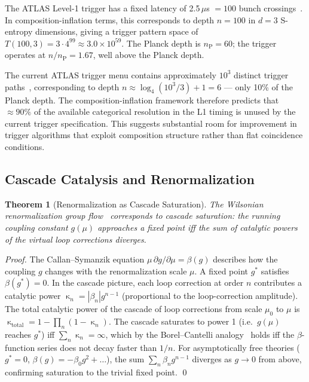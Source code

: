 \documentclass[twocolumn,10pt,a4paper]{article}
\theoremstyle{thmstyle}
\newtheorem{theorem}{Theorem}[section]
\theoremstyle{definition}
\theoremstyle{remark}
\newcommand{\nP}{n_{\mathrm{P}}}
\DeclareMathOperator{\catpow}{\kappa}
\begin{document}
The ATLAS Level-1 trigger has a fixed latency of 2.5\,$\mu$s $= 100$
bunch crossings~\citep{atlas_trigger_run2}. In composition-inflation
terms, this corresponds to depth $n = 100$ in $d = 3$ S-entropy
dimensions, giving a trigger pattern space of $T(100,3) = 3 \cdot
4^{99} \approx 3.0 \times 10^{59}$. The Planck depth is $\nP = 60$;
the trigger operates at $n/\nP = 1.67$, well above the Planck depth.

The current ATLAS trigger menu contains approximately $10^3$ distinct
trigger paths~\citep{atlas_trigger_run2}, corresponding to depth
$n \approx \log_4(10^3/3) + 1 = 6$ --- only 10\% of the Planck
depth. The composition-inflation framework therefore predicts that
$\approx 90\%$ of the available categorical resolution in the L1
timing is unused by the current trigger specification. This suggests
substantial room for improvement in trigger algorithms that exploit
composition structure rather than flat coincidence conditions.

\subsection{Cascade Catalysis and Renormalization}

\begin{theorem}[Renormalization as Cascade Saturation]
\label{thm:rg-saturation}
The Wilsonian renormalization group
flow~\citep{wilson1971renormalization,callan1970broken,symanzik1970small}
corresponds to cascade saturation: the running coupling constant
$g(\mu)$ approaches a fixed point iff the sum of catalytic powers
of the virtual loop corrections diverges.
\end{theorem}

\begin{proof}
The Callan--Symanzik equation $\mu\,\partial g/\partial\mu = \beta(g)$
describes how the coupling $g$ changes with the renormalization scale
$\mu$. A fixed point $g^*$ satisfies $\beta(g^*) = 0$. In the cascade
picture, each loop correction at order $n$ contributes a catalytic
power $\catpow_n = |\beta_n| g^{n-1}$ (proportional to the
loop-correction amplitude). The total catalytic power of the cascade
of loop corrections from scale $\mu_0$ to $\mu$ is
$\catpow_{\mathrm{total}} = 1 - \prod_n(1-\catpow_n)$. The cascade
saturates to power 1 (i.e.\ $g(\mu)$ reaches $g^*$) iff
$\sum_n \catpow_n = \infty$, which by the Borel--Cantelli
analogy~\citep{borel1909probabilites} holds iff the $\beta$-function
series does not decay faster than $1/n$. For asymptotically free
theories ($g^* = 0$, $\beta(g) = -\beta_0 g^2 + \ldots$), the sum
$\sum_n \beta_n g^{n-1}$ diverges as $g \to 0$ from above, confirming
saturation to the trivial fixed point. \qed
\end{proof}
\end{document}
